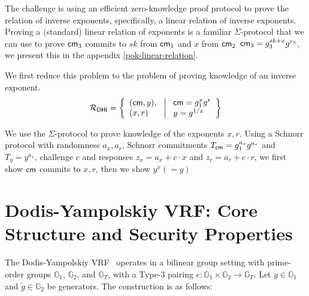 The challenge is using an efficient zero-knowledge proof protocol to prove the relation of inverse exponents, specifically, a linear relation of inverse exponents. Proving a (standard) linear relation of exponents is a familiar $\Sigma$-protocol that we can use to prove $\mathsf{cm}_3$ commits to $sk$ from $\mathsf{cm}_1$ and $x$ from $\mathsf{cm}_2$ $\mathsf{cm}_3 = g_3^{sk+x}g^{r_3}$, we present this in the appendix \ref{pok-linear-relation}. 

We first reduce this problem to the problem of proving knowledge of an inverse exponent.
\[
\mathcal{R}_{\mathsf{DHI}} = \left\{ 
\begin{array}{l} (\mathsf{cm}, y),\\
(x, r) 
\end{array}
\ \middle|
\ \begin{array}{l}
\mathsf{cm} = g_1^{x} g^r \\
y = g^{1/x} \\
\end{array} \right\}
\]

We use the $\Sigma$-protocol to prove knowledge of the exponents $x, r$. Using a Schnorr protocol with randomness $a_x, a_r$, Schnorr commitments $T_{\mathsf{cm}} = g_1^{a_x}g^{a_r}$ and $T_y = y^{a_x}$, challenge $c$ and responses $z_x = a_x + c \cdot x$ and $z_r = a_r + c \cdot r$, we first show $\mathsf{cm}$ commits to $x, r$, then we show $y^x (=g)$ 































\newpage
\section{Dodis-Yampolskiy VRF: Core Structure and Security Properties}

The Dodis-Yampolskiy VRF~\cite{hutchison_verifiable_2005} operates in a bilinear group setting with prime-order groups $\mathbb{G}_1$, $\mathbb{G}_2$, and $\mathbb{G}_T$, with a Type-3 pairing $e: \mathbb{G}_1 \times \mathbb{G}_2 \rightarrow \mathbb{G}_T$. Let $g \in \mathbb{G}_1$ and $\tilde{g} \in \mathbb{G}_2$ be generators. The construction is as follows:


